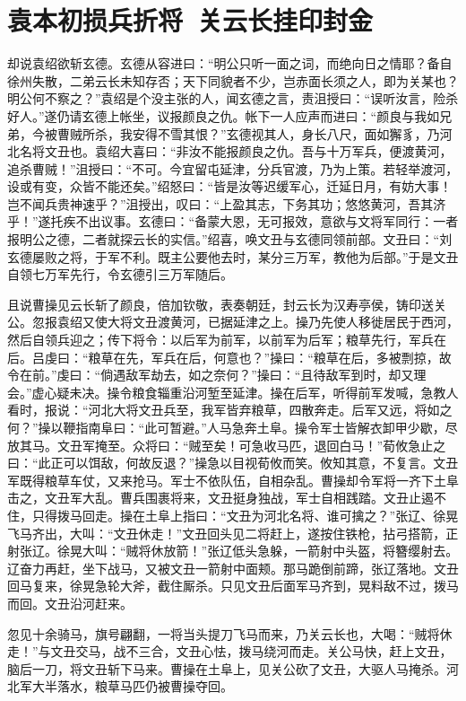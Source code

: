 \chapter{袁本初损兵折将~关云长挂印封金}

却说袁绍欲斩玄德。玄德从容进曰：“明公只听一面之词，而绝向日之情耶？备自徐州失散，二弟云长未知存否；天下同貌者不少，岂赤面长须之人，即为关某也？明公何不察之？”袁绍是个没主张的人，闻玄德之言，责沮授曰：“误听汝言，险杀好人。”遂仍请玄德上帐坐，议报颜良之仇。帐下一人应声而进曰：“颜良与我如兄弟，今被曹贼所杀，我安得不雪其恨？”玄德视其人，身长八尺，面如獬豸，乃河北名将文丑也。袁绍大喜曰：“非汝不能报颜良之仇。吾与十万军兵，便渡黄河，追杀曹贼！”沮授曰：“不可。今宜留屯延津，分兵官渡，乃为上策。若轻举渡河，设或有变，众皆不能还矣。”绍怒曰：“皆是汝等迟缓军心，迁延日月，有妨大事！岂不闻兵贵神速乎？”沮授出，叹曰：“上盈其志，下务其功；悠悠黄河，吾其济乎！”遂托疾不出议事。玄德曰：“备蒙大恩，无可报效，意欲与文将军同行：一者报明公之德，二者就探云长的实信。”绍喜，唤文丑与玄德同领前部。文丑曰：“刘玄德屡败之将，于军不利。既主公要他去时，某分三万军，教他为后部。”于是文丑自领七万军先行，令玄德引三万军随后。

且说曹操见云长斩了颜良，倍加钦敬，表奏朝廷，封云长为汉寿亭侯，铸印送关公。忽报袁绍又使大将文丑渡黄河，已据延津之上。操乃先使人移徙居民于西河，然后自领兵迎之；传下将令：以后军为前军，以前军为后军；粮草先行，军兵在后。吕虔曰：“粮草在先，军兵在后，何意也？”操曰：“粮草在后，多被剽掠，故令在前。”虔曰：“倘遇敌军劫去，如之奈何？”操曰：“且待敌军到时，却又理会。”虚心疑未决。操令粮食辎重沿河堑至延津。操在后军，听得前军发喊，急教人看时，报说：“河北大将文丑兵至，我军皆弃粮草，四散奔走。后军又远，将如之何？”操以鞭指南阜曰：“此可暂避。”人马急奔土阜。操令军士皆解衣卸甲少歇，尽放其马。文丑军掩至。众将曰：“贼至矣！可急收马匹，退回白马！”荀攸急止之曰：“此正可以饵敌，何故反退？”操急以目视荀攸而笑。攸知其意，不复言。文丑军既得粮草车仗，又来抢马。军士不依队伍，自相杂乱。曹操却令军将一齐下土阜击之，文丑军大乱。曹兵围裹将来，文丑挺身独战，军士自相践踏。文丑止遏不住，只得拨马回走。操在土阜上指曰：“文丑为河北名将、谁可擒之？”张辽、徐晃飞马齐出，大叫：“文丑休走！”文丑回头见二将赶上，遂按住铁枪，拈弓搭箭，正射张辽。徐晃大叫：“贼将休放箭！”张辽低头急躲，一箭射中头盔，将簪缨射去。辽奋力再赶，坐下战马，又被文丑一箭射中面颊。那马跪倒前蹄，张辽落地。文丑回马复来，徐晃急轮大斧，截住厮杀。只见文丑后面军马齐到，晃料敌不过，拨马而回。文丑沿河赶来。

忽见十余骑马，旗号翩翻，一将当头提刀飞马而来，乃关云长也，大喝：“贼将休走！”与文丑交马，战不三合，文丑心怯，拨马绕河而走。关公马快，赶上文丑，脑后一刀，将文丑斩下马来。曹操在土阜上，见关公砍了文丑，大驱人马掩杀。河北军大半落水，粮草马匹仍被曹操夺回。

